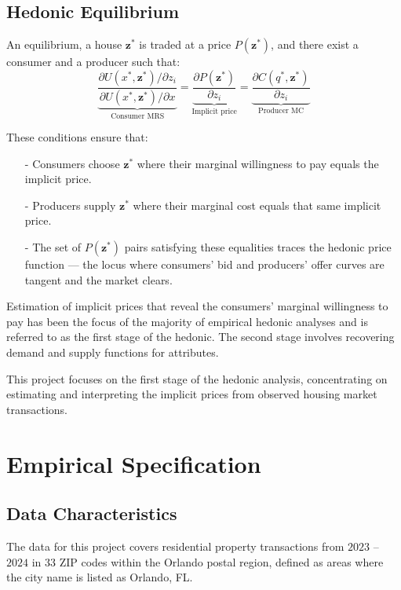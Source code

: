 \documentclass[11pt]{article}
\begin{document}
\subsection{Hedonic Equilibrium}

An equilibrium, a house $\mathbf z^{*}$ is traded at a price $P(\mathbf z^{*})$, and there exist a consumer and a producer such that:
\[
\underbrace{\frac{\partial U(x^{*},\mathbf z^{*})/\partial z_{i}}{\partial U(x^{*},\mathbf z^{*})/\partial x}}_{\text{Consumer MRS}}
=
\underbrace{\frac{\partial P(\mathbf z^*)}{\partial z_{i}}}_{\text{Implicit price}}
=
\underbrace{\frac{\partial C(q^{*},\mathbf z^{*})}{\partial z_{i}}}_{\text{Producer MC}}
\]

These conditions ensure that:
\begin{itemize}
    \item[-] Consumers choose $\mathbf z^{*}$ where their marginal willingness to pay equals the implicit price.
    \item[-] Producers supply $\mathbf z^{*}$ where their marginal cost equals that same implicit price.  
    \item[-] The set of $P(\mathbf z^*)$ pairs satisfying these equalities traces the hedonic price function --- the locus where consumers' bid and producers' offer curves are tangent and the market clears.
    
\end{itemize}


Estimation of implicit prices that reveal the consumers' marginal willingness to pay has been the focus of the majority of empirical hedonic analyses and is referred to as the first stage of the hedonic. The second stage involves recovering demand and supply functions for attributes.

This project focuses on the first stage of the hedonic analysis, concentrating on estimating and interpreting the implicit prices from observed housing market transactions.




\section{Empirical Specification}

\subsection{Data Characteristics}

The data for this project covers residential property transactions from $2023$ -- $2024$ in $33$ ZIP codes within the Orlando postal region, defined as areas where the city name is listed as Orlando, FL.
\end{document}
